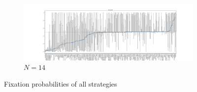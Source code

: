 \documentclass{article}
\begin{document}
\begin{figure}[!hbtp]
    \begin{subfigure}[t]{\textwidth}
        \centering
        \includegraphics[width=\textwidth]{../img/fixation_boxplot_14_std.pdf}
        \caption{\(N=14\)}
    \end{subfigure}%
    \caption{Fixation probabilities of all strategies}
    \label{fig:fixation_boxplot_std}
\end{figure}
\end{document}
